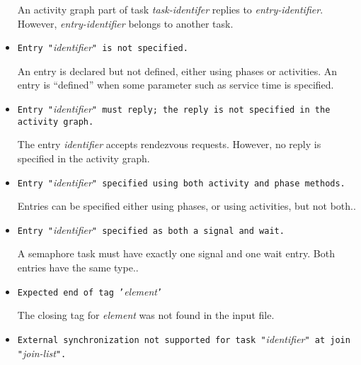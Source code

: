 \begin{itemize}
  An activity graph part of task \emph{task-identifer}
  replies to \emph{entry-identifier}.
  However, \emph{entry-identifier} belongs to another task.

\item \texttt{Entry "}\emph{identifier}\texttt{" is not specified.}
  
  An entry is declared but not defined, either using phases or
  activities.  An entry is
  ``defined'' when some parameter such as service
  time is specified.

\item \texttt{Entry "}\emph{identifier}\texttt{" must reply; the reply
    is not specified in the activity graph.}
  
  The entry \emph{identifier} accepts rendezvous
  requests.  However, no reply is specified
  in the activity graph.

\item \texttt{Entry "}\emph{identifier}\texttt{" specified using both
    activity and phase methods.}
  
  Entries can be specified either using phases, or
  using activities, but not
  both..

\item \texttt{Entry "}\emph{identifier}\texttt{" specified as both a signal and wait.}
  
  A semaphore task must have exactly one
  signal and one wait entry.  Both entries
  have the same type..


\item \texttt{Expected end of tag '}\emph{element}\texttt{'}

  The closing tag for \emph{element} was not found in the input file.

\item \texttt{External synchronization not supported for task
    "}\emph{identifier}\texttt{" at join
    "}\emph{join-list}\texttt{".}
  

\end{itemize}
